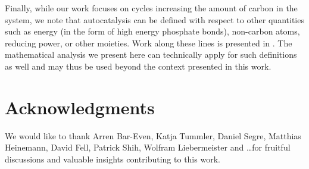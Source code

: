 \documentclass[a4page,notitlepage]{article}
\begin{document}
  Finally, while our work focuses on cycles increasing the amount of carbon in the system, we note that autocatalysis can be defined with respect to other quantities such as energy (in the form of high energy phosphate bonds), non-carbon atoms, reducing power, or other moieties.
  Work along these lines is presented in \cite{Reich1981-qd}.
  The mathematical analysis we present here can technically apply for such definitions as well and may thus be used beyond the context presented in this work.
\section{Acknowledgments}
We would like to thank Arren Bar-Even, Katja Tummler, Daniel Segre, Matthias Heinemann, David Fell, Patrick Shih, Wolfram Liebermeister  and \dots for fruitful discussions and valuable insights contributing to this work.
{}

\end{document}

